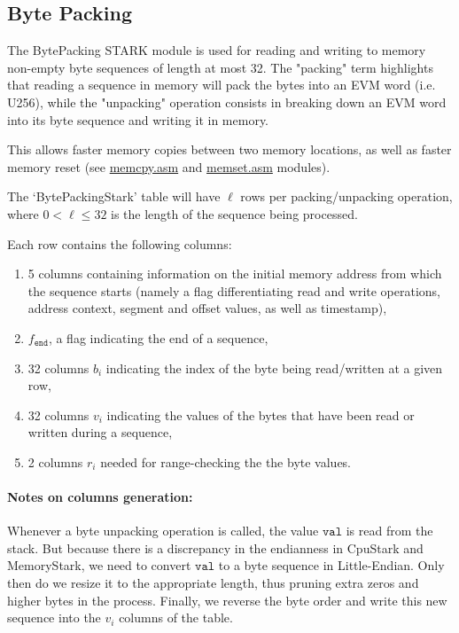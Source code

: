 \subsection{Byte Packing}
\label{byte-packing}

The BytePacking STARK module is used for reading and writing to memory non-empty byte sequences of length at most 32.
The "packing" term highlights that reading a sequence in memory will pack the bytes into an EVM word (i.e. U256), while
the "unpacking" operation consists in breaking down an EVM word into its byte sequence and writing it in memory.

This allows faster memory copies between two memory locations, as well as faster memory reset
(see \href{https://github.com/0xPolygonZero/plonky2/blob/main/evm/src/cpu/kernel/asm/memory/memcpy.asm}{memcpy.asm} and 
\href{https://github.com/0xPolygonZero/plonky2/blob/main/evm/src/cpu/kernel/asm/memory/memset.asm}{memset.asm} modules).

The `BytePackingStark' table will have $\ell$ rows per packing/unpacking operation, where $0 < \ell \leq 32$ is the length of the sequence being processed.

Each row contains the following columns:
\begin{enumerate}
    \item 5 columns containing information on the initial memory address from which the sequence starts
    (namely a flag differentiating read and write operations, address context, segment and offset values, as well as timestamp),
    \item $f_{\texttt{end}}$, a flag indicating the end of a sequence,
    \item 32 columns $b_i$ indicating the index of the byte being read/written at a given row,
    \item 32 columns $v_i$ indicating the values of the bytes that have been read or written during a sequence,
    \item 2 columns $r_i$ needed for range-checking the the byte values.
\end{enumerate}

\paragraph{Notes on columns generation:}
Whenever a byte unpacking operation is called, the value $\texttt{val}$ is read from the stack. But because there is a discrepancy in the endianness in CpuStark and MemoryStark, we need to convert $\texttt{val}$ to a byte sequence in Little-Endian. Only then do we resize it to the appropriate length, thus pruning extra zeros and higher bytes in the process. Finally, we reverse the byte order and write this new sequence into the $v_i$ columns of the table. 

